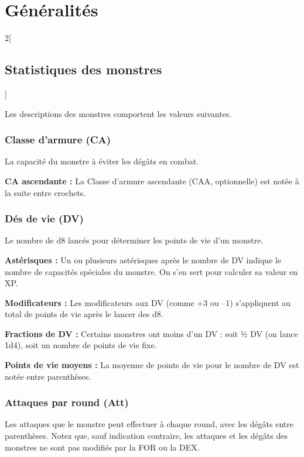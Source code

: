 \chapter{Généralités}\label{guxe9nuxe9ralituxe9s}

\begin{multicols}{2}[\section*{Statistiques des monstres}\label{statistiques-des-monstres}]

Les descriptions des monstres comportent les valeurs suivantes.

\subsection*{Classe d'armure (CA)}\label{classe-darmure-ca}

La capacité du monstre à éviter les dégâts en combat.

\textbf{CA ascendante :} La Classe d'armure ascendante (CAA,
optionnelle) est notée à la suite entre crochets.

\subsection*{Dés de vie (DV)}\label{duxe9s-de-vie-dv}

Le nombre de d8 lancés pour déterminer les points de vie d'un monstre.

\textbf{Astérisques :} Un ou plusieurs astérisques après le nombre de DV
indique le nombre de capacités spéciales du monstre. On s'en sert pour
calculer sa valeur en XP.

\textbf{Modificateurs :} Les modificateurs aux DV (comme +3 ou --1)
s'appliquent au total de points de vie après le lancer des d8.

\textbf{Fractions de DV :} Certains monstres ont moins d'un DV : soit ½
DV (on lance 1d4), soit un nombre de points de vie fixe.

\textbf{Points de vie moyens :} La moyenne de points de vie pour le
nombre de DV est notée entre parenthèses.

\subsection*{Attaques par round (Att)}\label{attaques-par-round-att}

Les attaques que le monstre peut effectuer à chaque round, avec les
dégâts entre parenthèses. Notez que, sauf indication contraire, les
attaques et les dégâts des monstres ne sont pas modifiés par la FOR ou
la DEX.


\end{multicols}
